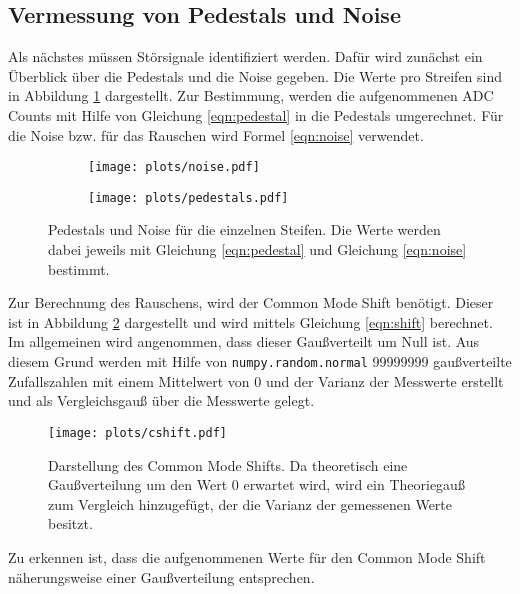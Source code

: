 \subsection{Vermessung von Pedestals und Noise}
\label{sec:noise}

Als nächstes müssen Störsignale identifiziert werden. Dafür wird zunächst ein Überblick 
über die Pedestals und die Noise gegeben. Die Werte pro Streifen sind in 
Abbildung \ref{fig:pedestals} dargestellt. Zur Bestimmung, werden die aufgenommenen 
ADC Counts mit Hilfe von Gleichung \eqref{eqn:pedestal} in die Pedestals umgerechnet. 
Für die Noise bzw. für das Rauschen wird Formel \eqref{eqn:noise} verwendet.


\begin{figure}[H]
\centering
\begin{subfigure}{.5\textwidth}
  \centering
  \texttt{[image: plots/noise.pdf]}
\end{subfigure}%
\begin{subfigure}{.5\textwidth}
  \centering
  \texttt{[image: plots/pedestals.pdf]}
\end{subfigure}
\caption{Pedestals und Noise für die einzelnen Steifen. Die Werte werden dabei jeweils mit 
Gleichung \eqref{eqn:pedestal} und Gleichung \eqref{eqn:noise} bestimmt.}
\label{fig:pedestals}
\end{figure}

Zur Berechnung des Rauschens, wird der Common Mode Shift benötigt. Dieser ist 
in Abbildung \ref{fig:shift} dargestellt und wird mittels Gleichung 
\eqref{eqn:shift} berechnet. Im allgemeinen wird angenommen, dass dieser 
Gaußverteilt um Null ist. Aus diesem Grund werden mit Hilfe von 
\texttt{numpy.random.normal} 99999999 gaußverteilte Zufallszahlen mit einem Mittelwert 
von 0 und der Varianz der Messwerte erstellt und als Vergleichsgauß über die Messwerte 
gelegt.

\begin{figure}[H]
  \centering
  \texttt{[image: plots/cshift.pdf]}
  \caption{Darstellung des Common Mode Shifts. Da theoretisch eine Gaußverteilung 
  um den Wert 0 erwartet wird, wird ein Theoriegauß zum Vergleich hinzugefügt, 
  der die Varianz der gemessenen Werte besitzt.}
  \label{fig:shift}
\end{figure}

Zu erkennen ist, dass die aufgenommenen Werte für den Common Mode Shift 
näherungsweise einer Gaußverteilung entsprechen.